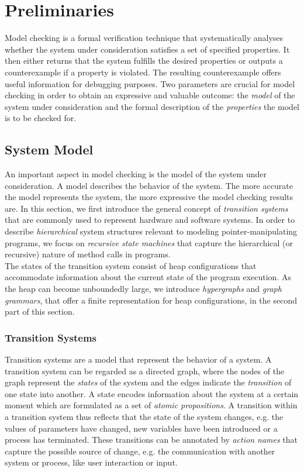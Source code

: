 \documentclass[a4paper, 12pt, twoside]{report}
\begin{document}
	\chapter{Preliminaries}
	
	Model checking is a formal verification technique that systematically analyses whether the system under consideration satisfies a set of specified properties. It then either returns that the system fulfills the desired properties or outputs a counterexample if a property is violated. The resulting counterexample offers useful information for debugging purposes. Two parameters are crucial for model checking in order to obtain an expressive and valuable outcome: the \textit{model} of the system under consideration and the formal description of the \textit{properties} the model is to be checked for.  
	
	\section{System Model}
	
	An important aspect in model checking is the model of the system under consideration. A model describes the behavior of the system. The more accurate the model represents the system, the more expressive the model checking results are. In this section, we first introduce the general concept of \textit{transition systems} that are commonly used to represent hardware and software systems. In order to describe \textit{hierarchical} system structures relevant to modeling pointer-manipulating programs, we focus on \textit{recursive state machines} that capture the hierarchical (or recursive) nature of method calls in programs. \\
	
	The states of the transition system consist of heap configurations that accommodate information about the current state of the program execution. As the heap can become unboundedly large, we introduce \textit{hypergraphs} and \textit{graph grammars}, that offer a finite representation for heap configurations, in the second part of this section.
	
	\subsection{Transition Systems}
	
	Transition systems are a model that represent the behavior of a system. A transition system can be regarded as a directed graph, where the nodes of the graph represent the \textit{states} of the system and the edges indicate the \textit{transition} of one state into another. A state encodes information about the system at a certain moment which are formulated as a set of \textit{atomic propositions}. A transition within a transition system thus reflects that the state of the system changes, e.g. the values of parameters have changed, new variables have been introduced or a process has terminated. These transitions can be annotated by \textit{action names} that capture the possible source of change, e.g. the communication with another system or process, like user interaction or input. 
	
\end{document}
